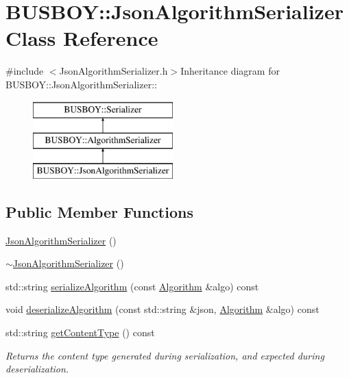 \hypertarget{classBUSBOY_1_1JsonAlgorithmSerializer}{
\section{BUSBOY::JsonAlgorithmSerializer Class Reference}
\label{classBUSBOY_1_1JsonAlgorithmSerializer}
}


{\ttfamily \#include $<$JsonAlgorithmSerializer.h$>$}Inheritance diagram for BUSBOY::JsonAlgorithmSerializer::\begin{figure}[H]
\begin{center}
\leavevmode
\includegraphics[height=3cm]{classBUSBOY_1_1JsonAlgorithmSerializer}
\end{center}
\end{figure}
\subsection*{Public Member Functions}
\begin{DoxyCompactItemize}
\item 
\hyperlink{classBUSBOY_1_1JsonAlgorithmSerializer_af0defa658500d35fe08826ddc109da74}{JsonAlgorithmSerializer} ()
\item 
\hyperlink{classBUSBOY_1_1JsonAlgorithmSerializer_a334bc3b875941d24d4018c4bc5c8adc4}{$\sim$JsonAlgorithmSerializer} ()
\item 
std::string \hyperlink{classBUSBOY_1_1JsonAlgorithmSerializer_a2d8cf25399a01735700b37f9e894f4f8}{serializeAlgorithm} (const \hyperlink{classBUSBOY_1_1Algorithm}{Algorithm} \&algo) const 
\item 
void \hyperlink{classBUSBOY_1_1JsonAlgorithmSerializer_a569938b93fb3a067168f1ca098aa8ea0}{deserializeAlgorithm} (const std::string \&json, \hyperlink{classBUSBOY_1_1Algorithm}{Algorithm} \&algo) const 
\item 
std::string \hyperlink{classBUSBOY_1_1JsonAlgorithmSerializer_a4cda821d824b5e42b927e99b54c75ba0}{getContentType} () const 
\begin{DoxyCompactList}\small\item\em Returns the content type generated during serialization, and expected during deserialization. \item\end{DoxyCompactList}\end{DoxyCompactItemize}


